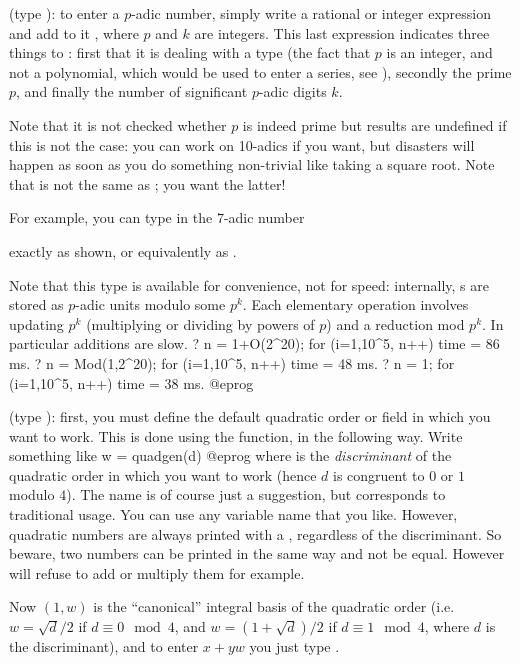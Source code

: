 \label{se:padic} (type
): to enter a $p$-adic number, simply write a rational or
integer expression and add to it , where $p$ and $k$
are integers. This last expression indicates three things to :
first that it is dealing with a  type (the fact that $p$ is an
integer, and not a polynomial, which would be used to enter a series, see
), secondly the prime $p$, and finally the number of
significant $p$-adic digits $k$.

Note that it is not checked whether $p$ is indeed prime but results are
undefined if this is not the case: you can work on 10-adics if you want,
but disasters will happen as soon as you do something non-trivial like
taking a square root. Note that  is not the same as
; you want the latter!

For example, you can type in the $7$-adic number


\noindent exactly as shown, or equivalently as .

Note that this type is available for convenience, not for speed:
internally, s are stored as $p$-adic units modulo some $p^k$.
Each elementary operation involves updating $p^k$ (multiplying or
dividing by powers of $p$) and a reduction mod $p^k$. In particular
additions are slow.
\bprog
    ? n = 1+O(2^20);   for (i=1,10^5, n++)
    time = 86 ms.
    ? n = Mod(1,2^20); for (i=1,10^5, n++)
    time = 48 ms.
    ? n = 1;           for (i=1,10^5, n++)
    time = 38 ms.
@eprog

 (type ): first,
you must define the default quadratic order or field in which you want to
work. This is done using the  function, in the following way.
Write something like
\bprog
    w = quadgen(d)
@eprog\noindent
where  is the \emph{discriminant} of the quadratic order in
which you want to work (hence $d$ is congruent to $0$ or $1$ modulo $4$). The
name  is of course just a suggestion, but corresponds to traditional
usage. You can use any variable name that you like. However,
quadratic numbers are always printed with a , regardless of the
discriminant. So beware, two numbers can be printed in the same way and not
be equal. However  will refuse to add or multiply them for example.

Now $(1,w)$ is the ``canonical'' integral basis of the quadratic order
(i.e.~$w=\sqrt{d}/2$ if $d\equiv 0 \mod 4$, and $w=(1+\sqrt{d})/2$ if
$d\equiv 1 \mod 4$, where $d$ is the discriminant), and to enter $x+yw$ you
just type .

